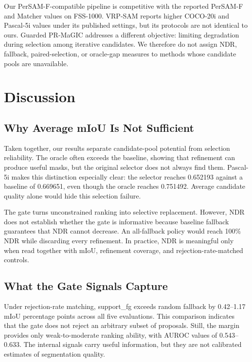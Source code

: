 \documentclass{CVM}
\begin{document}
Our PerSAM-F-compatible pipeline is competitive with the reported PerSAM-F and Matcher values on FSS-1000. VRP-SAM reports higher COCO-20i and Pascal-5i values under its published settings, but its protocols are not identical to ours. Guarded PR-MaGIC addresses a different objective: limiting degradation during selection among iterative candidates. We therefore do not assign NDR, fallback, paired-selection, or oracle-gap measures to methods whose candidate pools are unavailable.

\section{Discussion}

\subsection{Why Average mIoU Is Not Sufficient}

Taken together, our results separate candidate-pool potential from selection reliability. The oracle often exceeds the baseline, showing that refinement can produce useful masks, but the original selector does not always find them. Pascal-5i makes this distinction especially clear: the selector reaches 0.652193 against a baseline of 0.669651, even though the oracle reaches 0.751492. Average candidate quality alone would hide this selection failure.

The gate turns unconstrained ranking into selective replacement. However, NDR does not establish whether the gate is informative because baseline fallback guarantees that NDR cannot decrease. An all-fallback policy would reach 100\% NDR while discarding every refinement. In practice, NDR is meaningful only when read together with mIoU, refinement coverage, and rejection-rate-matched controls.

\subsection{What the Gate Signals Capture}

Under rejection-rate matching, support\_fg exceeds random fallback by 0.42--1.17 mIoU percentage points across all five evaluations. This comparison indicates that the gate does not reject an arbitrary subset of proposals. Still, the margin provides only weak-to-moderate ranking ability, with AUROC values of 0.543--0.633. The internal signals carry useful information, but they are not calibrated estimates of segmentation quality.
\end{document}
